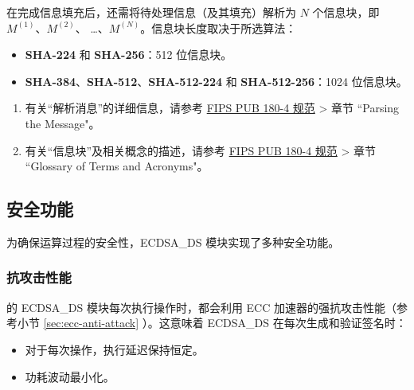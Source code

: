 \documentclass[main\_\_CN.tex]{subfiles}
\begin{document}
在完成信息填充后，还需将待处理信息（及其填充）解析为 \begin{math}N\end{math} 个信息块，即 \begin{math}M^{(1)}\end{math}、\begin{math}M^{(2)}\end{math}、 \dots、\begin{math}M^{(N)}\end{math}。信息块长度取决于所选算法：

\begin{itemize}
    \item \textbf{SHA-224} 和 \textbf{SHA-256}：512 位信息块。
    \item \textbf{SHA-384}、\textbf{SHA-512}、\textbf{SHA-512-224} 和 \textbf{SHA-512-256}：1024 位信息块。
\end{itemize}

\begin{tiplisting}
\begin{enumerate}
\vspace{-2.5em}
    \item 有关“解析消息”的详细信息，请参考 \href{https://doi.org/10.6028/NIST.FIPS.180-4}{FIPS PUB 180-4 规范} > 章节 ``Parsing the Message"。
    \item 有关“信息块”及相关概念的描述，请参考 \href{https://doi.org/10.6028/NIST.FIPS.180-4}{FIPS PUB 180-4 规范} > 章节 ``Glossary of Terms and Acronyms"。
\end{enumerate}
\end{tiplisting}



\subsection{安全功能}
\label{sec:ecdsa-security_features}
为确保运算过程的安全性，ECDSA\_DS 模块实现了多种安全功能。

\subsubsection{抗攻击性能}

\chipseries{} 的 ECDSA\_DS 模块每次执行操作时，都会利用 ECC 加速器的强抗攻击性能（参考小节 \ref{sec:ecc-anti-attack} \textit{}）。这意味着 ECDSA\_DS 在每次生成和验证签名时：

\begin{itemize}
    \item 对于每次操作，执行延迟保持恒定。
    \item 功耗波动最小化。
\end{itemize}
\end{document}
